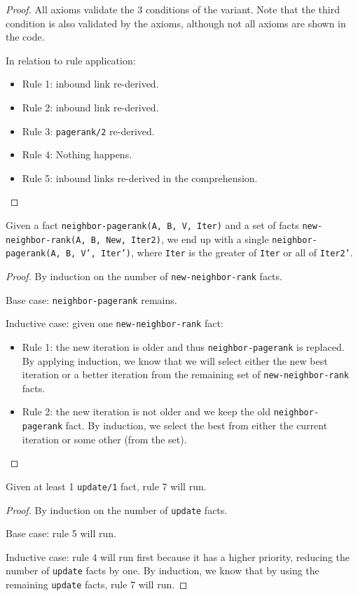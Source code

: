 \begin{proof}

All axioms validate the 3 conditions of the variant. Note that the third
condition is also validated by the axioms, although not all axioms are shown in
the code.

In relation to rule application:

\begin{itemize}
   \item Rule 1: inbound link re-derived.
   \item Rule 2: inbound link re-derived.
   \item Rule 3: \texttt{pagerank/2} re-derived.
   \item Rule 4: Nothing happens.
   \item Rule 5: inbound links re-derived in the comprehension.
\end{itemize}
\end{proof}

\begin{lemma}
Given a fact \texttt{neighbor-pagerank(A, B, V, Iter)} and a set of facts
\texttt{new-neighbor-rank(A, B, New, Iter2)}, we end up with a single
\texttt{neighbor-pagerank(A, B, V', Iter')}, where \texttt{Iter} is the greater of
\texttt{Iter} or all of \texttt{Iter2'}.
\end{lemma}
\begin{proof}
By induction on the number of \texttt{new-neighbor-rank} facts.

Base case: \texttt{neighbor-pagerank} remains.

Inductive case: given one \texttt{new-neighbor-rank} fact:

\begin{itemize}
   \item Rule 1: the new iteration is older and thus \texttt{neighbor-pagerank}
   is replaced. By applying induction, we know that we will select either the
   new best iteration or a better iteration from the remaining set of
   \texttt{new-neighbor-rank} facts.
   \item Rule 2: the new iteration is not older and we keep the old
   \texttt{neighbor-pagerank} fact. By induction, we select the best from either
   the current iteration or some other (from the set).
\end{itemize}
\end{proof}

\begin{lemma}
Given at least 1 \texttt{update/1} fact, rule 7 will run.
\end{lemma}
\begin{proof}
By induction on the number of \texttt{update} facts.

Base case: rule 5 will run.

Inductive case: rule 4 will run first because it has a higher priority, reducing
the number of \texttt{update} facts by one. By induction, we know that by
using the remaining \texttt{update} facts, rule 7 will run.
\end{proof}

